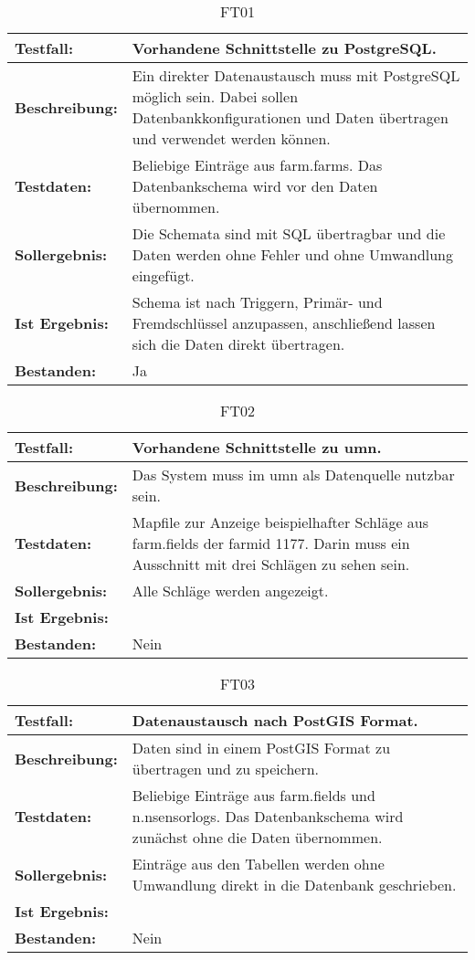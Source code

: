 \label{appendix:funktionstests} 
\capstartfalse
\begin{table}[h!]
\centering
\small
\begin{tabular}{p{2.8cm}|p{12cm}}
\textbf{Testfall:} & Vorhandene Schnittstelle zu PostgreSQL. \\ \hline
\textbf{Beschreibung:} & Ein direkter Datenaustausch muss mit PostgreSQL möglich sein. Dabei sollen Datenbankkonfigurationen und Daten übertragen und verwendet werden können. \\ \hline
\textbf{Testdaten:} & Beliebige Einträge aus farm.farms. Das Datenbankschema wird vor den Daten übernommen. \\ \hline
\textbf{Sollergebnis:} & Die Schemata sind mit SQL übertragbar und die Daten werden ohne Fehler und ohne Umwandlung eingefügt. \\ \hline
\textbf{Ist Ergebnis:} & Schema ist nach Triggern, Primär- und Fremdschlüssel anzupassen, anschließend lassen sich die Daten direkt übertragen. \\ \hline
\textbf{Bestanden:} & Ja \\
\end{tabular}
\caption*{FT01}
\end{table}

\begin{table}[h!]
\centering
\small
\begin{tabular}{p{2.8cm}|p{12cm}}
\textbf{Testfall:} & Vorhandene Schnittstelle zu \Gls{umn}. \\ \hline
\textbf{Beschreibung:} & Das System muss im \Gls{umn} als Datenquelle nutzbar sein. \\ \hline
\textbf{Testdaten:} & Mapfile zur Anzeige beispielhafter Schläge aus farm.fields der farmid 1177. Darin muss ein Ausschnitt mit drei Schlägen zu sehen sein. \\ \hline
\textbf{Sollergebnis:} & Alle Schläge werden angezeigt. \\ \hline
\textbf{Ist Ergebnis:} &  \\ \hline %
\textbf{Bestanden:} & Nein \\
\end{tabular}
\caption*{FT02}
\end{table}

\begin{table}[h!]
\centering
\small
\begin{tabular}{p{2.8cm}|p{12cm}}
\textbf{Testfall:} & Datenaustausch nach PostGIS Format. \\ \hline
\textbf{Beschreibung:} & Daten sind in einem PostGIS Format zu übertragen und zu speichern. \\ \hline
\textbf{Testdaten:} & Beliebige Einträge aus farm.fields und n.nsensorlogs. Das Datenbankschema wird zunächst ohne die Daten übernommen. \\ \hline
\textbf{Sollergebnis:} & Einträge aus den Tabellen werden ohne Umwandlung direkt in die Datenbank geschrieben. \\ \hline
\textbf{Ist Ergebnis:} &  \\ \hline %
\textbf{Bestanden:} & Nein \\
\end{tabular}
\caption*{FT03}
\end{table}

